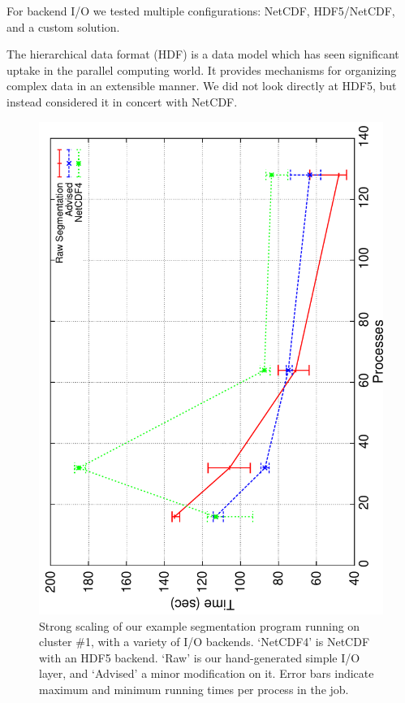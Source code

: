 For backend I/O we tested multiple configurations: NetCDF, HDF5/NetCDF,
and a custom solution.

The hierarchical data format (HDF) is a data model which has seen
significant uptake in the parallel computing world.  It provides
mechanisms for organizing complex data in an extensible manner.  We did
not look directly at HDF5, but instead considered it in concert with
NetCDF.

\begin{figure}
  \centering
  \includegraphics[angle=270,width=\linewidth]{images/io/lens-most}
  \caption{Strong scaling of our example segmentation program running
  on cluster \#1, with a variety of I/O backends.  `NetCDF4' is NetCDF
  with an HDF5 backend.  `Raw' is our hand-generated simple I/O layer,
  and `Advised' a minor modification on it.  Error bars indicate
  maximum and minimum running times per process in the job.}
  \label{fig:lens-most}
\end{figure}

